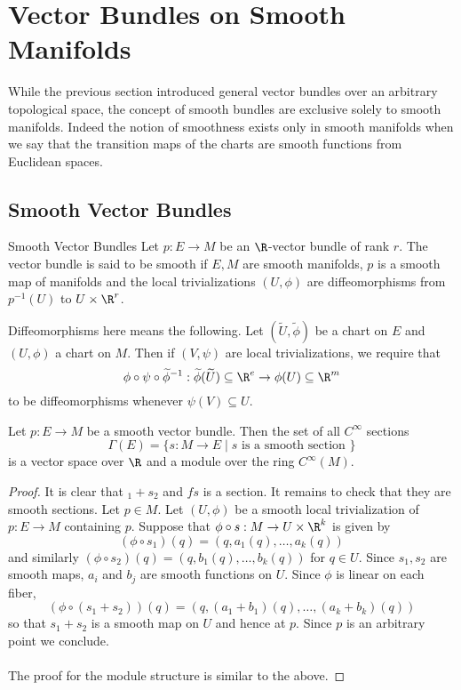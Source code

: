 \documentclass[a4paper]{article}
\begin{document}
\pagebreak
\section{Vector Bundles on Smooth Manifolds}
While the previous section introduced general vector bundles over an arbitrary topological space, the concept of smooth bundles are exclusive solely to smooth manifolds. Indeed the notion of smoothness exists only in smooth manifolds when we say that the transition maps of the charts are smooth functions from Euclidean spaces. 

\subsection{Smooth Vector Bundles}
\begin{defn}{Smooth Vector Bundles}{} Let $p:E\to M$ be an $\R$-vector bundle of rank $r$. The vector bundle is said to be smooth if $E,M$ are smooth manifolds, $p$ is a smooth map of manifolds and the local trivializations $(U,\phi)$ are diffeomorphisms from $p^{-1}(U)$ to $U\times\R^r$. 
\end{defn}

Diffeomorphisms here means the following. Let $(\widetilde{U},\widetilde{\phi})$ be a chart on $E$ and $(U,\phi)$ a chart on $M$. Then if $(V,\psi)$ are local trivializations, we require that $$\phi\circ\psi\circ\widetilde{\phi}^{-1}:\widetilde{\phi}(\widetilde{U})\subseteq\R^e\to\phi(U)\subseteq\R^m$$ to be diffeomorphisms whenever $\psi(V)\subseteq U$. 

\begin{prp}{}{} Let $p:E\to M$ be a smooth vector bundle. Then the set of all $C^\infty$ sections $$\Gamma(E)=\{s:M\to E\;|\;s\text{ is a smooth section }\}$$ is a vector space over $\R$ and a module over the ring $C^\infty(M)$. \tcbline
\begin{proof}
It is clear that $_1+s_2$ and $fs$ is a section. It remains to check that they are smooth sections. Let $p\in M$. Let $(U,\phi)$ be a smooth local trivialization of $p:E\to M$ containing $p$. Suppose that $\phi\circ s:M\to U\times\R^k$ is given by $$(\phi\circ s_1)(q)=(q,a_1(q),\dots,a_k(q))$$ and similarly $(\phi\circ s_2)(q)=(q,b_1(q),\dots,b_k(q))$ for $q\in U$. Since $s_1,s_2$ are smooth maps, $a_i$ and $b_j$ are smooth functions on $U$. Since $\phi$ is linear on each fiber, $$(\phi\circ(s_1+s_2))(q)=(q,(a_1+b_1)(q),\dots,(a_k+b_k)(q))$$ so that $s_1+s_2$ is a smooth map on $U$ and hence at $p$. Since $p$ is an arbitrary point we conclude. \\~\\

The proof for the module structure is similar to the above. 
\end{proof}
\end{prp}
\end{document}
